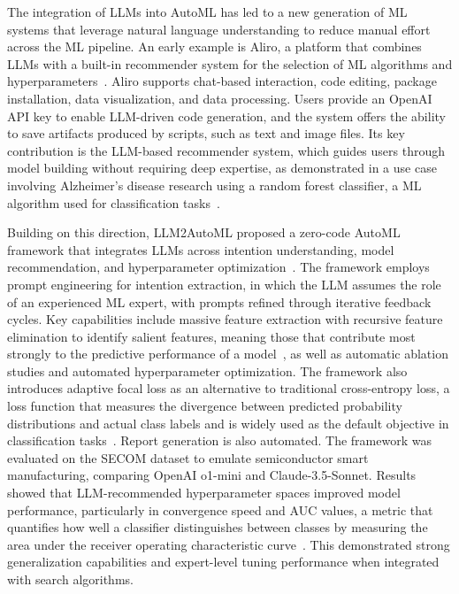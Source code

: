 \documentclass[
english,                 %
bibtex,                  %
includeExtraAbstracts, %
]{kththesis}
\numberwithin{listing}{chapter}
\begin{document}
The integration of \glspl{LLM} into \gls{AutoML} has led to a new generation of \gls{ML} systems that leverage natural language understanding to reduce manual effort across the \gls{ML} pipeline. An early example is Aliro, a platform that combines \glspl{LLM} with a built-in recommender system for the selection of \gls{ML} algorithms and hyperparameters~\cite{choi_aliro_2023}. Aliro supports chat-based interaction, code editing, package installation, data visualization, and data processing. Users provide an Open\Gls{AI} \gls{API} key to enable \gls{LLM}-driven code generation, and the system offers the ability to save artifacts produced by scripts, such as text and image files. Its key contribution is the \gls{LLM}-based recommender system, which guides users through model building without requiring deep expertise, as demonstrated in a use case involving Alzheimer's disease research using a random forest classifier, a \gls{ML} algorithm used for classification tasks~\cite{goodfellow_deep_2016}.

Building on this direction, \gls{LLM2AutoML} proposed a zero-code \gls{AutoML} framework that integrates \glspl{LLM} across intention understanding, model recommendation, and hyperparameter optimization~\cite{chen_llm2automl_2024}. The framework employs prompt engineering for intention extraction, in which the \gls{LLM} assumes the role of an experienced \gls{ML} expert, with prompts refined through iterative feedback cycles. Key capabilities include massive feature extraction with recursive feature elimination to identify salient features, meaning those that contribute most strongly to the predictive performance of a model~\cite{jim_dowling_building_2025}, as well as automatic ablation studies and automated hyperparameter optimization. The framework also introduces adaptive focal loss as an alternative to traditional cross-entropy loss, a loss function that measures the divergence between predicted probability distributions and actual class labels and is widely used as the default objective in classification tasks~\cite{rumelhart_learning_1986}. Report generation is also automated. The framework was evaluated on the \gls{SECOM} dataset to emulate semiconductor smart manufacturing, comparing Open\Gls{AI} o1-mini and Claude-3.5-Sonnet. Results showed that \gls{LLM}-recommended hyperparameter spaces improved model performance, particularly in convergence speed and \gls{AUC} values, a metric that quantifies how well a classifier distinguishes between classes by measuring the area under the receiver operating characteristic curve~\cite{alzubaidi_review_2021}. This demonstrated strong generalization capabilities and expert-level tuning performance when integrated with search algorithms.
\end{document}
